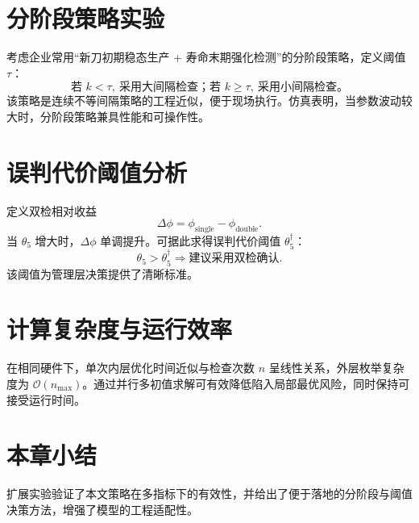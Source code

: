 \section{分阶段策略实验}
考虑企业常用“新刀初期稳态生产 + 寿命末期强化检测”的分阶段策略，定义阈值 $\tau$：
\[
\text{若 }k<\tau,\ \text{采用大间隔检查；若 }k\ge\tau,\ \text{采用小间隔检查。}
\]
该策略是连续不等间隔策略的工程近似，便于现场执行。仿真表明，当参数波动较大时，分阶段策略兼具性能和可操作性。

\section{误判代价阈值分析}
定义双检相对收益
\[
\Delta\phi=\phi_{\text{single}}-\phi_{\text{double}}.
\]
当 $\theta_5$ 增大时，$\Delta\phi$ 单调提升。可据此求得误判代价阈值 $\theta_5^\dagger$：
\[
\theta_5>\theta_5^\dagger \Rightarrow \text{建议采用双检确认}.
\]
该阈值为管理层决策提供了清晰标准。

\section{计算复杂度与运行效率}
在相同硬件下，单次内层优化时间近似与检查次数 $n$ 呈线性关系，外层枚举复杂度为 $\mathcal O(n_{\max})$。通过并行多初值求解可有效降低陷入局部最优风险，同时保持可接受运行时间。

\section{本章小结}
扩展实验验证了本文策略在多指标下的有效性，并给出了便于落地的分阶段与阈值决策方法，增强了模型的工程适配性。
